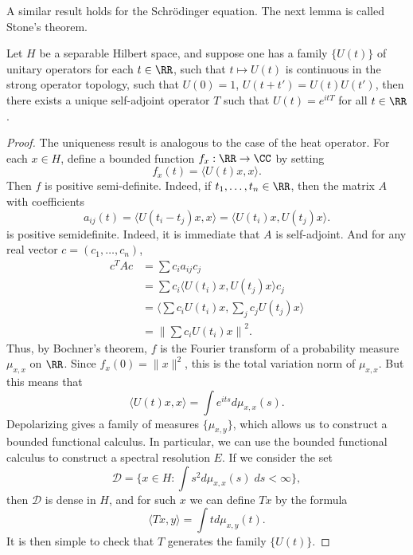 A similar result holds for the Schr\"{o}dinger equation. The next lemma is called Stone's theorem.

\begin{lemma}
    Let $H$ be a separable Hilbert space, and suppose one has a family $\{ U(t) \}$ of unitary operators for each $t \in \RR$, such that $t \mapsto U(t)$ is continuous in the strong operator topology, such that $U(0) = 1$, $U(t + t') = U(t) U(t')$, then there exists a unique self-adjoint operator $T$ such that $U(t) = e^{itT}$ for all $t \in \RR$.
\end{lemma}
\begin{proof}
    The uniqueness result is analogous to the case of the heat operator. For each $x \in H$, define a bounded function $f_x: \RR \to \CC$ by setting
    \[ f_x(t) = \langle U(t) x, x \rangle. \]
    Then $f$ is positive semi-definite. Indeed, if $t_1,\dots,t_n \in \RR$, then the matrix $A$ with coefficients
    \[ a_{ij}(t) = \langle U(t_i - t_j) x, x \rangle = \langle U(t_i) x, U(t_j) x \rangle. \]
    is positive semidefinite. Indeed, it is immediate that $A$ is self-adjoint. And for any real vector $c = (c_1,\dots,c_n)$,
    \begin{align*}
        c^T A c &= \sum c_i a_{ij} c_j\\
        &= \sum c_i \langle U(t_i) x, U(t_j) x \rangle c_j\\
        &= \langle \sum c_i U(t_i) x, \sum_j c_j U(t_j) x \rangle\\
        &= \left\| \sum c_i U(t_i) x \right\|^2.
    \end{align*}
    Thus, by Bochner's theorem, $f$ is the Fourier transform of a probability measure $\mu_{x,x}$ on $\RR$. Since $f_x(0) = \| x \|^2$, this is the total variation norm of $\mu_{x,x}$. But this means that
    \[ \langle U(t) x, x \rangle = \int e^{its} d\mu_{x,x}(s). \]
    Depolarizing gives a family of measures $\{ \mu_{x,y} \}$, which allows us to construct a bounded functional calculus. In particular, we can use the bounded functional calculus to construct a spectral resolution $E$. If we consider the set
    \[ \mathcal{D} = \{ x \in H: \int s^2 d\mu_{x,x}(s)\; ds < \infty \}, \]
    then $\mathcal{D}$ is dense in $H$, and for such $x$ we can define $Tx$ by the formula
    \[ \langle Tx, y \rangle = \int t d\mu_{x,y}(t). \]
    It is then simple to check that $T$ generates the family $\{ U(t) \}$.
\end{proof}

